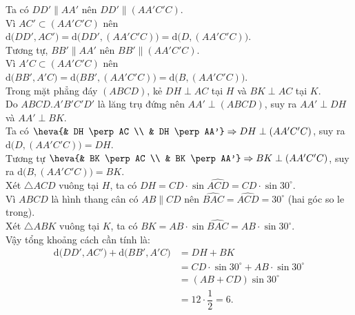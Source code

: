 \begin{ex}
{\begin{center}
		\end{center}
		Ta có $DD' \parallel AA'$ nên $DD' \parallel (AA'C'C)$.\\
		Vì $AC' \subset (AA'C'C)$ nên $\mathrm{d}\big(DD', AC'\big) = \mathrm{d}\big(DD', (AA'C'C)\big) = \mathrm{d}\big(D, (AA'C'C)\big)$.\\
		Tương tự, $BB' \parallel AA'$ nên $BB' \parallel (AA'C'C)$.\\
		Vì $A'C \subset (AA'C'C)$ nên $\mathrm{d}\big(BB', A'C\big) = \mathrm{d}\big(BB', (AA'C'C)\big) = \mathrm{d}\big(B, (AA'C'C)\big)$.\\
		Trong mặt phẳng đáy $(ABCD)$, kẻ $DH \perp AC$ tại $H$ và $BK \perp AC$ tại $K$.\\
		Do $ABCD.A'B'C'D'$ là lăng trụ đứng nên $AA' \perp (ABCD)$, suy ra $AA' \perp DH$ và $AA' \perp BK$.\\
		Ta có $\heva{& DH \perp AC \\ & DH \perp AA'} \Rightarrow DH \perp (AA'C'C)$, suy ra $\mathrm{d}\big(D, (AA'C'C)\big) = DH$.\\
		Tương tự $\heva{& BK \perp AC \\ & BK \perp AA'} \Rightarrow BK \perp (AA'C'C)$, suy ra $\mathrm{d}\big(B, (AA'C'C)\big) = BK$.\\
		Xét $\triangle ACD$ vuông tại $H$, ta có $DH = CD \cdot \sin \widehat{ACD} = CD \cdot \sin 30^\circ$.\\
		Vì $ABCD$ là hình thang cân có $AB \parallel CD$ nên $\widehat{BAC} = \widehat{ACD} = 30^\circ$ (hai góc so le trong).\\
		Xét $\triangle ABK$ vuông tại $K$, ta có $BK = AB \cdot \sin \widehat{BAC} = AB \cdot \sin 30^\circ$.\\
		Vậy tổng khoảng cách cần tính là:
		\begin{align*} 
			\mathrm{d}\big(DD', AC'\big) + \mathrm{d}\big(BB', A'C\big) &= DH + BK \\ 
			&= CD \cdot \sin 30^\circ + AB \cdot \sin 30^\circ \\ 
			&= (AB + CD) \sin 30^\circ \\ 
			&= 12 \cdot \dfrac{1}{2} = 6. 
		\end{align*}
	}
\end{ex}


